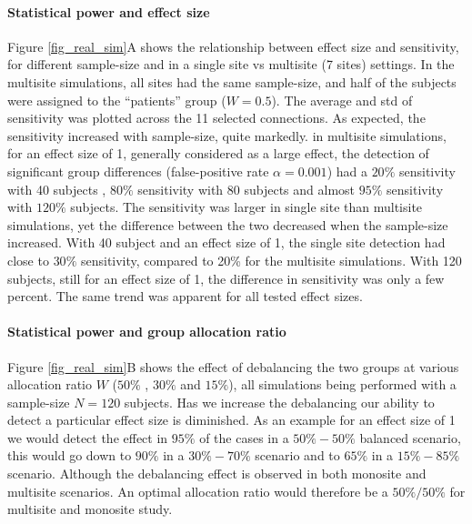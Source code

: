 \documentclass[authoryear]{elsarticle}
\begin{document}
\paragraph{Statistical power and effect size} Figure \ref{fig_real_sim}A shows the relationship between effect size and sensitivity, for different sample-size and in a single site vs multisite (7 sites) settings. In the multisite simulations, all sites had the same sample-size, and half of the subjects were assigned to the ``patients'' group ($W=0.5$). The average and std of sensitivity was plotted across the 11 selected connections. As expected, the sensitivity increased with sample-size, quite markedly. in multisite simulations, for an effect size of 1, generally considered as a large effect, the detection of significant group differences (false-positive rate $\alpha=0.001$) had a $20\%$ sensitivity with 40 subjects , $80\%$ sensitivity with 80 subjects and almost $95\%$ sensitivity with $120\%$ subjects. The sensitivity was larger in single site than multisite simulations, yet the difference between the two decreased when the sample-size increased. With 40 subject and an effect size of 1, the single site detection had close to $30\%$ sensitivity, compared to 20\% for the multisite simulations. With 120 subjects, still for an effect size of 1, the difference in sensitivity was only a few percent. The same trend was apparent for all tested effect sizes. 

\paragraph{Statistical power and group allocation ratio} Figure \ref{fig_real_sim}B shows the effect of debalancing the two groups at various allocation ratio $W$ ($50\%$ , $30\%$ and $15\%$), all simulations being performed with a sample-size $N=120$  subjects. Has we increase the debalancing our ability to detect a particular effect size is diminished. As an example for an effect size of 1 we would detect the effect in $95\%$ of the cases in a $50\%-50\%$ balanced scenario, this would go down to $90\%$ in a $30\%-70\%$ scenario and to $65\%$ in a $15\%-85\%$ scenario. Although the debalancing effect  is observed in both monosite and multisite scenarios. An optimal allocation ratio would therefore be a $50\%/50\%$ for multisite and monosite study.
\end{document}
